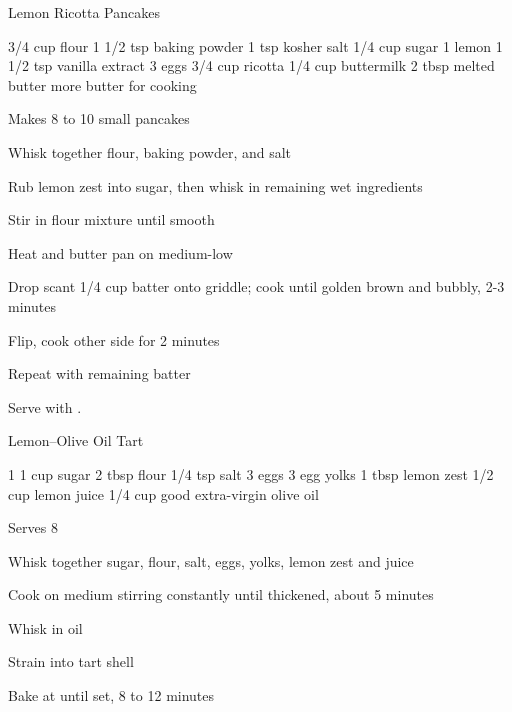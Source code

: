 \begin{denserecipe}{Lemon Ricotta Pancakes}{}
\begin{ingredients}
3/4 cup flour
1 1/2 tsp baking powder
1 tsp kosher salt
1/4 cup sugar
1 lemon
1 1/2 tsp vanilla extract
3 eggs
3/4 cup ricotta
1/4 cup buttermilk
2 tbsp melted butter
more butter for cooking
\end{ingredients}
\nextcolumn
Makes 8 to 10 small pancakes
\begin{steps}
\item Whisk together flour, baking powder, and salt
\item Rub lemon zest into sugar, then whisk in remaining wet ingredients
\item Stir in flour mixture until smooth
\item Heat and butter pan on medium-low
\item Drop scant 1/4 cup batter onto griddle; cook until golden brown and bubbly, 2-3 minutes
\item Flip, cook other side for 2 minutes
\item Repeat with remaining batter
\end{steps}
Serve with .
\end{denserecipe}

\begin{recipe}{Lemon--Olive Oil Tart}{}
\begin{ingredients}
1 
1 cup sugar
2 tbsp flour
1/4 tsp salt
3 eggs
3 egg yolks
1 tbsp lemon zest
1/2 cup lemon juice
1/4 cup good extra-virgin olive oil
\end{ingredients}
\nextcolumn
Serves 8
\begin{steps}
    \item Whisk together sugar, flour, salt, eggs, yolks, lemon zest and juice
    \item Cook on medium stirring constantly until thickened, about 5 minutes
    \item Whisk in oil
    \item Strain into tart shell
    \item Bake at  until set, 8 to 12 minutes
\end{steps}
\end{recipe}

